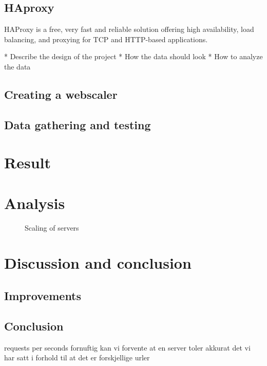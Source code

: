 \subsection{HAproxy}
HAProxy is a free, very fast and reliable solution offering high availability,
load balancing, and proxying for TCP and HTTP-based
applications. \cite{haproxy:2014}

* Describe the design of the project
* How the data should look
* How to analyze the data

\subsection{Creating a webscaler}

\subsection{Data gathering and testing}


\section{Result}

\section{Analysis}
\begin{figure}[htp]
\centering
{}
\caption{\label{fig:server_scaling}Scaling of servers}
\end{figure}

\section{Discussion and conclusion}

\subsection{Improvements}

\subsection{Conclusion}



requests per seconds fornuftig kan vi forvente at en server toler akkurat
det vi har satt i forhold til at det er forskjellige urler

